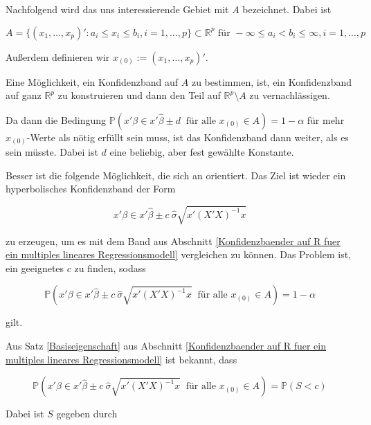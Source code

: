 \documentclass[12pt,a4paper]{article}
\theoremstyle{definition}
\theoremstyle{definition}
\theoremstyle{definition}
\theoremstyle{definition}
\begin{document}
Nachfolgend wird das uns interessierende Gebiet mit $A$ bezeichnet. Dabei ist 

\begin{equation*}
A = \{(x_1, \ldots, x_p)' : a_i \leq x_i \leq b_i, i = 1, \ldots, p \} \subset \mathbb{R}^p \text{ für } - \infty \leq a_i < b_i \leq \infty, i=1, \ldots, p
\end{equation*}

Außerdem definieren wir $x_{(0)} := (x_1, \ldots, x_p)'$.

Eine Möglichkeit, ein Konfidenzband auf $A$ zu bestimmen, ist, ein Konfidenzband auf ganz $\mathbb{R}^p$ zu konstruieren und dann den Teil auf $\mathbb{R}^{p} \setminus A$ zu vernachlässigen.

Da dann die Bedingung $\mathbb{P}(x'\beta \in x' \hat{\beta} \pm d ~ \text{ für alle } x_{(0)} \in A) = 1-\alpha$ für mehr $x_{(0)}$-Werte als nötig erfüllt sein muss, ist das Konfidenzband dann weiter, als es sein müsste. Dabei ist $d$ eine beliebig, aber fest gewählte Konstante.

Besser ist die folgende Möglichkeit, die sich an \cite[70]{Liu64} orientiert. Das Ziel ist wieder ein hyperbolisches Konfidenzband der Form 

\begin{equation}
x'\beta \in x' \hat{\beta} \pm c ~ \hat{\sigma} \sqrt{x' (X'X)^{-1}x} \label{hyperbolisches_KB}
\end{equation}

zu erzeugen, um es mit dem Band aus Abschnitt \ref{Konfidenzbaender auf R fuer ein multiples lineares Regressionsmodell} vergleichen zu können. Das Problem ist, ein geeignetes $c$ zu finden, sodass 

\begin{equation*}
\mathbb{P} \left( x'\beta \in x' \hat{\beta} \pm c ~ \hat{\sigma} \sqrt{x' (X'X)^{-1}x} ~ \text{ für alle } x_{(0)} \in A \right) = 1-\alpha
\end{equation*}
 
gilt.

Aus Satz \ref{Basiseigenschaft} aus Abschnitt \ref{Konfidenzbaender auf R fuer ein multiples lineares Regressionsmodell} ist bekannt, dass 

\begin{equation*}
\mathbb{P} \left( x'\beta \in x' \hat{\beta} \pm c ~ \hat{\sigma} \sqrt{x' (X'X)^{-1}x} ~ \text{ für alle } x_{(0)} \in A \right) = \mathbb{P}(S<c)
\end{equation*}

Dabei ist $S$ gegeben durch 
\end{document}
